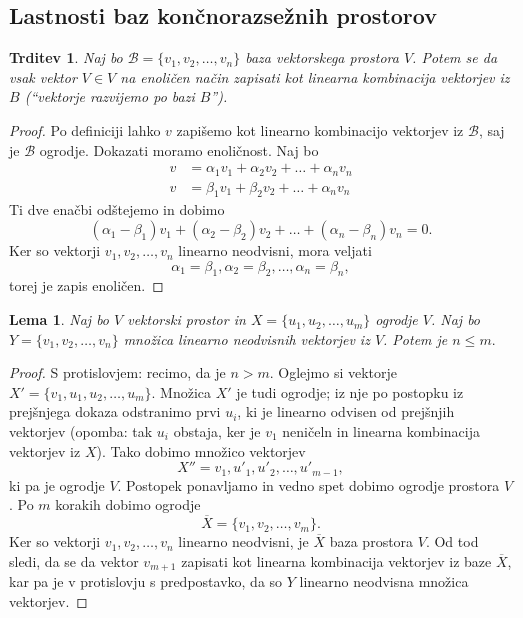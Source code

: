 \documentclass[10pt, a4paper]{article}
\newtheorem{trditev}[izr]{Trditev}
\newtheorem{lema}[izr]{Lema}
\newenvironment{noticeC}{%
  \tcolorbox[%
  notitle,
  empty,
  enhanced,  %
  breakable,
  coltext=black, 
  fontupper=\rmfamily,
  parbox=false,
  noparskip,
  sharp corners,
  boxrule=-1pt,  %
  frame hidden,
  left=7pt,  %
  right=7pt,
  top=5pt,
  bottom=5pt,
  before skip=2.5ex plus 2pt,
  after skip=2.5ex plus 2pt,
  overlay unbroken and last={%
  },
  ]}
{\endtcolorbox}
\newenvironment{dokaz}%
  {\begin{noticeC}\begin{proof}}%
  {\end{proof}\end{noticeC}}
\begin{document}
\subsection{Lastnosti baz končnorazsežnih prostorov}

\begin{trditev}
    Naj bo $\mathcal{B} = \{v_1, v_2, \dots, v_n\}$ baza vektorskega prostora $V$.
    Potem se da vsak vektor $V \in V$ na enoličen način zapisati kot linearna kombinacija vektorjev iz $B$ ("`vektorje razvijemo po bazi $B$"').
\end{trditev}

\begin{dokaz}
    Po definiciji lahko $v$ zapišemo kot linearno kombinacijo vektorjev iz $\mathcal{B}$, saj je $\mathcal{B}$ ogrodje.
    Dokazati moramo enoličnost.
    Naj bo
    \begin{align*}
        v &= \alpha_1 v_1 + \alpha_2 v_2 + \dots + \alpha_n v_n\\
        v &= \beta_1 v_1 + \beta_2 v_2 + \dots + \alpha_n v_n
    \end{align*}
    Ti dve enačbi odštejemo in dobimo
    $$(\alpha_1 - \beta_1) v_1 + (\alpha_2 - \beta_2) v_2 + \dots + (\alpha_n - \beta_n) v_n = 0.$$
    Ker so vektorji $v_1, v_2, \dots, v_n$ linearno neodvisni, mora veljati
    $$\alpha_1 = \beta_1,\alpha_2 = \beta_2,\dots,\alpha_n = \beta_n,$$
    torej je zapis enoličen.
\end{dokaz}

\begin{lema}
    Naj bo $V$ vektorski prostor in $X = \{u_1, u_2, \dots, u_m\}$ ogrodje $V$.
    Naj bo $Y = \{v_1, v_2, \dots, v_n\}$ množica linearno neodvisnih vektorjev iz $V$. 
    Potem je $n \leq m.$
\end{lema}

\begin{dokaz}
    S protislovjem: recimo, da je $n > m.$ 
    Oglejmo si vektorje $X' = \{v_1, u_1, u_2, \dots, u_m\}$.
    Množica $X'$ je tudi ogrodje; iz nje po postopku iz prejšnjega dokaza odstranimo prvi $u_i$, ki je linearno odvisen od prejšnjih vektorjev
    (opomba: tak $u_i$ obstaja, ker je $v_1$ neničeln in linearna kombinacija vektorjev iz $X$).
    Tako dobimo množico vektorjev
    $$X'' = {v_1, u'_1, u'_2, \dots, u'_{m-1}},$$
    ki pa je ogrodje $V$.
    Postopek ponavljamo in vedno spet dobimo ogrodje prostora $V$.
    Po $m$ korakih dobimo ogrodje
    $$\overline{X} = \{v_1, v_2, \dots, v_m\}.$$
    Ker so vektorji $v_1, v_2, \dots, v_n$ linearno neodvisni, je $\overline{X}$ baza prostora $V$.
    Od tod sledi, da se da vektor $v_{m+1}$ zapisati kot linearna kombinacija vektorjev iz baze $\overline{X}$,
    kar pa je v protislovju s predpostavko, da so $Y$ linearno neodvisna množica vektorjev.
\end{dokaz}
\end{document}
